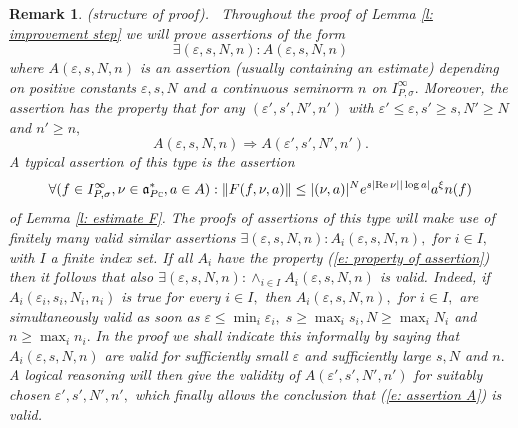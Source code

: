 \documentclass[12pt,a4paper]{article}
\newtheorem{Rem}[Thm]{Remark}
\newenvironment{rem}[0]{\begin{Rem}\noindent\rm}%
{\end{Rem}}
\def\msy#1{{\mathbb #1}}
\def\C{{\msy C}}
\def\ge{\varepsilon}
\def\gs{\sigma}
\def\got#1{\mathfrak #1}
\def\fa{{\got a}}
\def\implies{\Rightarrow}
\def\Re{{\rm Re}\,}
\def\implies{\Leftarrow}
\def\iC{{\scriptscriptstyle \C}}
\numberwithin{Thm}{section}
\numberwithin{equation}{section}
\def\implies{\Rightarrow}
\def\faPdc{{\fa_{P\iC}^*}}
\numberwithin{equation}{section}
\def\faPdc{\fa_{P\iC}^*}
\def\snorm{n}
\def\IPgs{I_{P,\gs}^\infty}
\def\xxi{\xi}
\begin{document}
\begin{rem}{\rm (structure of proof).\ }
Throughout the proof of Lemma \ref{l: improvement step} we will prove assertions of the form
\begin{equation}
\label{e: assertion A}
\exists (\ge,s, N, n): A(\ge, s, N, n)
\end{equation} where $A(\ge, s , N, n)$ is an assertion (usually containing an estimate) depending on positive constants $\ge, s, N$ and a continuous seminorm $n$ on $\IPgs.$ 
Moreover, the assertion has the property that for any $(\ge', s', N', n')$ with 
$\ge' \leq \ge, s' \geq s, N' \geq N$ and $n' \geq n,$ 
\begin{equation}
\label{e: property of assertion}
A(\ge, s, N, n) \implies A(\ge', s', N', n').
\end{equation}
A typical assertion of this type is the assertion 
$$ 
\forall (f \in \IPgs, \nu \in \faPdc, a \in A): 
\|F(f, \nu, a)\| \leq |(\nu,a)|^N e^{s |\Re \nu| |\log a| } a^\xxi \snorm(f)
$$ 
of Lemma \ref{l: estimate F}.
The proofs of assertions of this type will make use of finitely many valid similar assertions
$\exists (\ge, s, N, n) : A_i(\ge, s, N, n),$ for $i \in I,$ with $I$ a finite index set. If all $A_i$ have the property (\ref{e: property of assertion}) then it follows that also 
$\exists  (\ge, s, N, n) : \wedge_{i\in I} A_i(\ge, s, N, n) $ is valid. Indeed, if $A_i(\ge_i , s_i, N_i, n_i)$ 
is true for every $i \in I,$ then $A_i(\ge, s, N, n),$ for $i \in I,$ are simultaneously valid 
as soon as $\ge \leq \min_i \ge_i, \; s \geq \max_i s_i , N \geq \max_i N_i$ and $n \geq \max_i n_i.$ 
In the proof we shall indicate this informally by saying 
that $A_i(\ge, s, N, n)$ are valid for sufficiently small 
$\ge$ and sufficiently large $s,N$ and $n.$ A logical reasoning will then give
the validity of $A(\ge', s', N', n')$ for suitably chosen $\ge', s', N', n',$ which finally allows 
the conclusion that (\ref{e: assertion A}) is valid.
\end{rem} 
\end{document}
